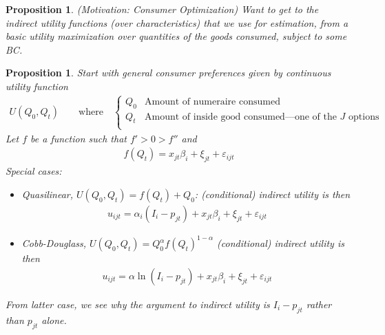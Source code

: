 \documentclass[12pt]{article}
\theoremstyle{plain}
\newtheorem{prop}[thm]{Proposition}
\theoremstyle{definition}
\theoremstyle{remark}
\begin{document}
\begin{prop}
\emph{(Motivation: Consumer Optimization)}
Want to get to the indirect utility functions (over characteristics)
that we use for estimation, from a basic utility maximization over
quantities of the goods consumed, subject to some BC.
\end{prop}


\begin{prop}
Start with general consumer preferences given by continuous utility
function
\begin{align*}
  U(Q_0,Q_t)
  \qquad\text{where}\quad
  \begin{cases}
    Q_0 & \text{Amount of numeraire consumed} \\
    Q_t &
    \text{Amount of inside good consumed---one of the $J$ options}
    \\
  \end{cases}
\end{align*}
Let $f$ be a function such that $f'>0>f''$ and
\begin{align*}
    f(Q_t) = x_{jt}\beta_i + \xi_{jt} + \varepsilon_{ijt}
\end{align*}
Special cases:
\begin{itemize}
  \item Quasilinear, $U(Q_0,Q_t)=f(Q_t)+Q_0$:
    (conditional) indirect utility is then
    \begin{align*}
      u_{ijt}
      = \alpha_i (I_i-p_{jt}) + x_{jt}\beta_i + \xi_{jt} +
      \varepsilon_{ijt}
    \end{align*}
  \item Cobb-Douglass, $U(Q_0,Q_t)=Q_0^\alpha f(Q_t)^{1-\alpha}$
    (conditional) indirect utility is then
    \begin{align*}
      u_{ijt}
      = \alpha \ln(I_i-p_{jt}) + x_{jt}\beta_i + \xi_{jt} +
      \varepsilon_{ijt}
    \end{align*}
\end{itemize}
From latter case, we see why the argument to indirect utility is
$I_i-p_{jt}$ rather than $p_{jt}$ alone.
\end{prop}
\end{document}
